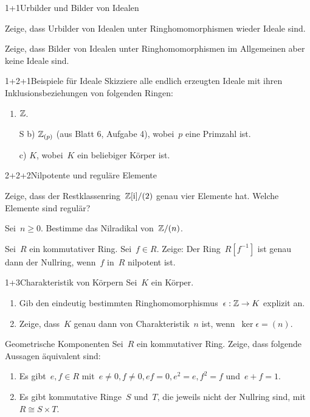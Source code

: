 \documentclass{algblatt}
\begin{document}

\begin{aufgabeE}{1+1}{Urbilder und Bilder von Idealen}
\item Zeige, dass Urbilder von Idealen unter Ringhomomorphismen wieder Ideale
sind.
\item Zeige, dass Bilder von Idealen unter Ringhomomorphismen im Allgemeinen
aber keine Ideale sind.
\end{aufgabeE}

\begin{aufgabe}{1+2+1}{Beispiele für Ideale}
Skizziere alle endlich erzeugten Ideale mit ihren Inklusionsbeziehungen von
folgenden Ringen:
\begin{enumerate}
\item $\mathbb{Z}$.
\item[S b)] $\mathbb{Z}_{(p)}$ (aus Blatt 6, Aufgabe 4), wobei~$p$ eine Primzahl ist.
\item[c)] $K$, wobei~$K$ ein beliebiger Körper ist.
\end{enumerate}
\end{aufgabe}

\begin{aufgabeE}{2+2+2}{Nilpotente und reguläre Elemente}
\item Zeige, dass der Restklassenring~$\mathbb{Z}[\mathrm{i}]/(2)$ genau vier Elemente hat.
Welche Elemente sind regulär?
\item Sei~$n \geq 0$. Bestimme das Nilradikal von~$\mathbb{Z}/(n)$.
\item Sei~$R$ ein kommutativer Ring. Sei~$f \in R$. Zeige: Der Ring~$R[f^{-1}]$ ist
genau dann der Nullring, wenn~$f$ in~$R$ nilpotent ist.
\end{aufgabeE}

\begin{aufgabe}{1+3}{Charakteristik von Körpern}
Sei~$K$ ein Körper.
\begin{enumerate}
\item Gib den eindeutig bestimmten Ringhomomorphismus~$\epsilon : \mathbb{Z} \to K$
explizit an.
\item Zeige, dass~$K$ genau dann von Charakteristik~$n$ ist, wenn~$\ker
\epsilon = (n)$.
\end{enumerate}
\end{aufgabe}

\begin{aufgabe}{4}{Geometrische Komponenten}
Sei~$R$ ein kommutativer Ring. Zeige, dass folgende Aussagen äquivalent sind:
\begin{enumerate}
\item Es gibt~$e, f \in R$ mit~$e \neq 0, f \neq 0, ef = 0, e^2 = e, f^2 = f$
und~$e + f = 1$.
\item Es gibt kommutative Ringe~$S$ und~$T$, die jeweils nicht der Nullring
sind, mit~$R \cong S \times T$.
\end{enumerate}
\end{aufgabe}
\end{document}

